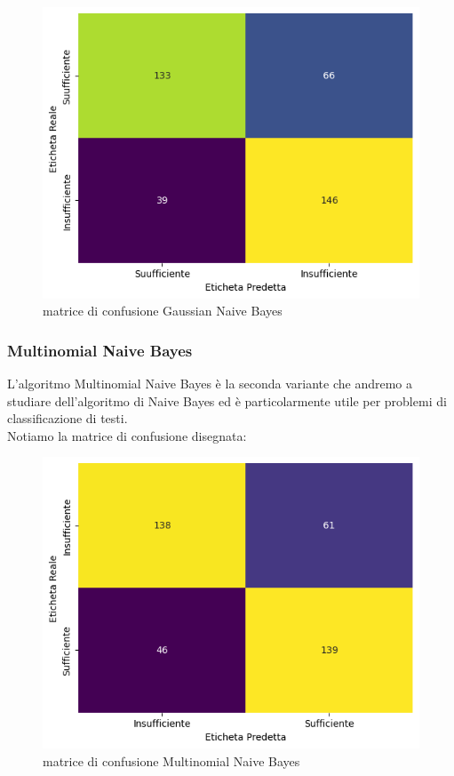 \documentclass{article}
\begin{document}
\begin{titlepage}
         \begin{figure}[ht]
            \centering
            \includegraphics[width=0.6\linewidth]{confusion_matrix-GNB.png}
            \caption{  matrice di confusione Gaussian Naive Bayes}
            \label{fig:enter-label}
        \end{figure}
        
        \subsubsection{Multinomial Naive Bayes}
        L'algoritmo Multinomial Naive Bayes è la seconda variante che andremo a studiare dell'algoritmo di Naive Bayes ed è particolarmente utile per problemi di classificazione di testi.\\ Notiamo la matrice di confusione disegnata:
        \begin{figure}[ht]
            \centering
            \includegraphics[width=0.6\linewidth]{confusion_matrix-MNB.png}
            \caption{  matrice di confusione Multinomial Naive Bayes}
            \label{fig:enter-label}
        \end{figure}
        

\end{titlepage}
\end{document}
